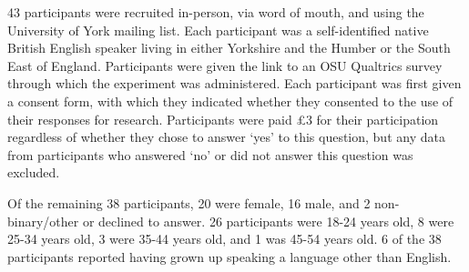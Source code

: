 \documentclass[titlepage,12pt]{article}
\begin{document}
43 participants were recruited in-person, via word of mouth, and using the University of York mailing list. Each participant was a self-identified native British English speaker living in either Yorkshire and the Humber or the South East of England. Participants were given the link to an OSU Qualtrics survey through which the experiment was administered. Each participant was first given a consent form, with which they indicated whether they consented to the use of their responses for research. Participants were paid £3 for their participation regardless of whether they chose to answer `yes' to this question, but any data from participants who answered `no' or did not answer this question was excluded.

Of the remaining 38 participants, 20 were female, 16 male, and 2 non-binary/other or declined to answer. 26 participants were 18-24 years old, 8 were 25-34 years old, 3 were 35-44 years old, and 1 was 45-54 years old. 
6 of the 38 participants reported having grown up speaking a language other than English. 

\end{document}
